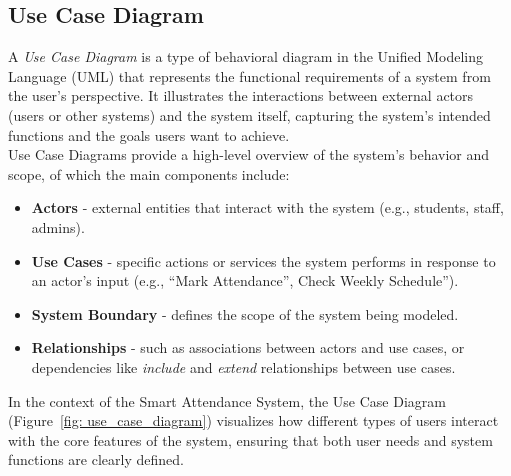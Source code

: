 \documentclass[a4paper, 12pt]{article}
\begin{document}
    \subsection{Use Case Diagram}
      A \emph{Use Case Diagram} is a type of behavioral diagram in the Unified Modeling Language (UML) that 
      represents the functional requirements of a system from the user's perspective. 
      It illustrates the interactions between external actors (users or other systems) and the system itself, 
      capturing the system's intended functions and the goals users want to achieve.\\

      \noindent Use Case Diagrams provide a high-level overview of the system's behavior and scope, of which the main components include:
      
      \begin{itemize}
        \item \textbf{Actors} - external entities that interact with the system (e.g., students, staff, admins).
        \item \textbf{Use Cases} - specific actions or services the system performs in response to an actor's input (e.g., “Mark Attendance”, Check Weekly Schedule”).
        \item \textbf{System Boundary} - defines the scope of the system being modeled.
        \item \textbf{Relationships} - such as associations between actors and use cases, or dependencies like \emph{include} and \emph{extend} relationships between use cases.
      \end{itemize}
      
      In the context of the Smart Attendance System, the Use Case Diagram (Figure~\ref{fig: use_case_diagram}) visualizes how different types of users interact with the core features of the system, ensuring that both user needs and system functions are clearly defined.
      \newpage
\end{document}
